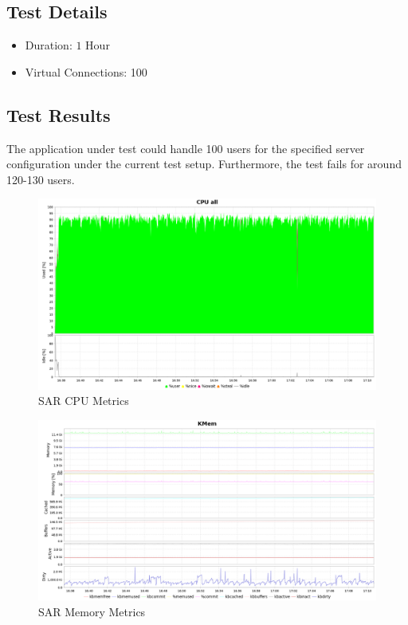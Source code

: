 \documentclass[12pt]{article}
\begin{document}
\subsection*{Test Details}
\begin{itemize}
	\item Duration: $1$ Hour
	\item Virtual Connections: 100
\end{itemize}

\subsection*{Test Results}
The application under test could handle 100 users for the specified server configuration under the current test setup. Furthermore, the test fails for around 120-130 users.
\begin{figure}[h!]
	\centering
	\includegraphics[width=\textwidth,height=\textheight,keepaspectratio]{intro/cpu_mridul.png}
	\caption{SAR CPU Metrics}
\end{figure}
\begin{figure}[h!]
	\centering
	\includegraphics[width=\textwidth,height=\textheight,keepaspectratio]{intro/mem_mridul.png}
	\caption{SAR Memory Metrics}
\end{figure}
\end{document}
